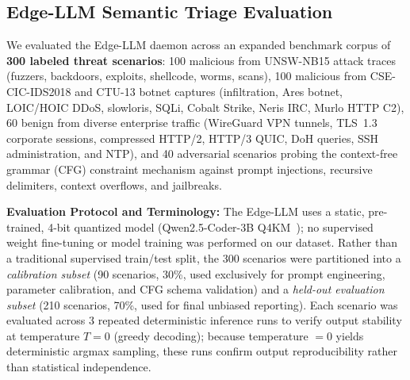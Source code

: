 \documentclass{ieeeaccess}
\renewcommand{\_}{\textunderscore\allowbreak}
\begin{document}
\subsection{Edge-LLM Semantic Triage Evaluation}
We evaluated the Edge-LLM daemon across an expanded benchmark corpus of \textbf{300 labeled threat scenarios}:
100 malicious from UNSW-NB15 attack traces (fuzzers, backdoors, exploits, shellcode, worms, scans),
100 malicious from CSE-CIC-IDS2018 and CTU-13 botnet captures (infiltration, Ares botnet, LOIC/HOIC DDoS, slowloris, SQLi, Cobalt Strike, Neris IRC, Murlo HTTP C2),
60 benign from diverse enterprise traffic (WireGuard VPN tunnels, TLS~1.3 corporate sessions, compressed HTTP/2, HTTP/3 QUIC, DoH queries, SSH administration, and NTP), and
40 adversarial scenarios probing the context-free grammar (CFG) constraint mechanism against prompt injections, recursive delimiters, context overflows, and jailbreaks.

\textbf{Evaluation Protocol and Terminology:} The Edge-LLM uses a static, pre-trained,
4-bit quantized model (Qwen2.5-Coder-3B Q4\_K\_M~\cite{qwen2024qwen25coder}); no supervised
weight fine-tuning or model training was performed on our dataset. Rather than a traditional
supervised train/test split, the 300 scenarios were partitioned into a
\emph{calibration subset} (90 scenarios, 30\%, used exclusively for prompt
engineering, parameter calibration, and CFG schema validation) and a \emph{held-out evaluation subset}
(210 scenarios, 70\%, used for final unbiased reporting). Each scenario was evaluated across
3 repeated deterministic inference runs to verify output stability at temperature $T=0$
(greedy decoding); because temperature $=0$ yields deterministic argmax sampling, these
runs confirm output reproducibility rather than statistical independence.
\end{document}
